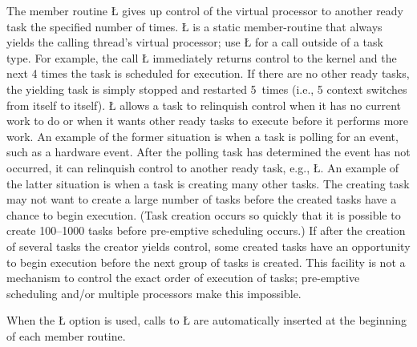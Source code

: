 \documentclass[openright,twoside]{report}
\begin{document}
The member routine \LGinlinetrue\LGbegin\lgrinde\L{}\endlgrinde\LGend{} gives up control of the virtual processor to another ready task the specified number of times.
\LGinlinetrue\LGbegin\lgrinde\L{}\endlgrinde\LGend{} is a static member-routine that always yields the calling thread's virtual processor;
use \LGinlinetrue\LGbegin\lgrinde\L{}\endlgrinde\LGend{} for a call outside of a task type.
For example, the call \LGinlinetrue\LGbegin\lgrinde\L{}\endlgrinde\LGend{} immediately returns control to the \uC kernel and the next 4 times the task is scheduled for execution.
If there are no other ready tasks, the yielding task is simply stopped and restarted 5~times (i.e., 5 context switches from itself to itself).
\LGinlinetrue\LGbegin\lgrinde\L{}\endlgrinde\LGend{} allows a task to relinquish control when it has no current work to do or when it wants other ready tasks to execute before it performs more work.
An example of the former situation is when a task is polling for an event, such as a hardware event.
After the polling task has determined the event has not occurred, it can relinquish control to another ready task, e.g., \LGinlinetrue\LGbegin\lgrinde\L{}\endlgrinde\LGend{}.
An example of the latter situation is when a task is creating many other tasks.
The creating task may not want to create a large number of tasks before the created tasks have a chance to begin execution.
(Task creation occurs so quickly that it is possible to create 100--1000 tasks before pre-emptive scheduling occurs.)
If after the creation of several tasks the creator yields control, some created tasks have an opportunity to begin execution before the next group of tasks is created.
This facility is not a mechanism to control the exact order of execution of tasks;
pre-emptive scheduling and/or multiple processors make this impossible.

\begin{annotation}
When the \LGinlinetrue\LGbegin\lgrinde\L{}\endlgrinde\LGend{} option is used, calls to \LGinlinetrue\LGbegin\lgrinde\L{}\endlgrinde\LGend{} are automatically inserted at the beginning of each member routine.
\end{annotation}
\end{document}
